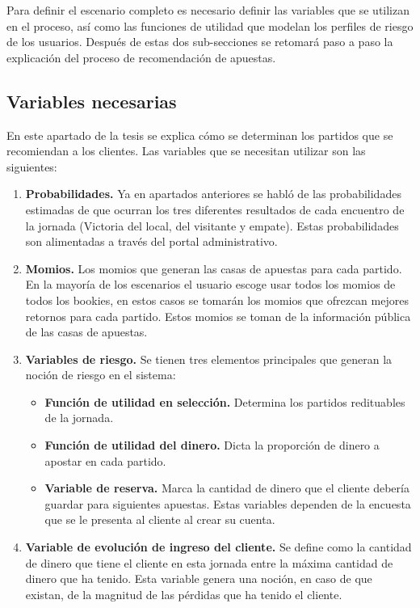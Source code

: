 Para definir el escenario completo es necesario definir las variables que se utilizan en el proceso, así como las funciones de utilidad que modelan los perfiles de riesgo de los usuarios. Después de estas dos sub-secciones se retomará paso a paso la explicación del proceso de recomendación de apuestas.
 
\subsection{Variables necesarias}
\label{subsec:variables-necesarias}
En este apartado de la tesis se explica cómo se determinan los partidos que se recomiendan a los clientes.
Las variables que se necesitan utilizar son las siguientes:
\begin{enumerate}
	\item \textbf{Probabilidades.} Ya en apartados anteriores se habló de las probabilidades estimadas de que ocurran los tres diferentes resultados de cada encuentro de la jornada (Victoria del local, del visitante y empate). Estas probabilidades son alimentadas a través del portal administrativo.
	
	\item \textbf{Momios.} Los momios que generan las casas de apuestas para cada partido. En la mayoría de los escenarios el usuario escoge usar todos los momios de todos los bookies, en estos casos se tomarán los momios que ofrezcan mejores retornos para cada partido. Estos momios se toman de la información pública de las casas de apuestas.
	
	\item \textbf{Variables de riesgo.} Se tienen tres elementos principales que generan la noción de riesgo en el sistema:
	\begin{itemize}
		\item \textbf{Función de utilidad en selección.} Determina los partidos redituables de la jornada.
		\item \textbf{Función de utilidad del dinero.} Dicta la proporción de dinero a apostar en cada partido.
		\item \textbf{Variable de reserva.} Marca la cantidad de dinero que el cliente debería guardar para siguientes apuestas.
		Estas variables dependen de la encuesta que se le presenta al cliente al crear su cuenta.
	\end{itemize}
	
	\item \textbf{Variable de evolución de ingreso del cliente.} Se define como la cantidad de dinero que tiene el cliente en esta jornada entre la máxima cantidad de dinero que ha tenido. Esta variable genera una noción, en caso de que existan, de la magnitud de las pérdidas que ha tenido el cliente.
\end{enumerate}

